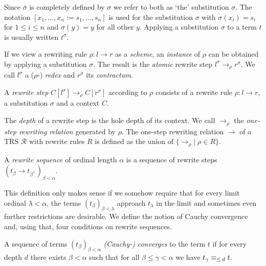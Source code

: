 Since $\bar{\sigma}$ is completely defined by $\sigma$ we refer to both as
`the' substitution $\sigma$. The notation $[x_1, \ldots, x_n := s_1, \ldots,
  s_n]$ is used for the substitution $\sigma$ with $\sigma(x_i) = s_i$ for $1
\leq i \leq n$ and $\sigma(y) = y$ for all other $y$. Applying a substitution
$\sigma$ to a term $t$ is usually written $t^\sigma$.

If we view a rewriting rule $\rho : l \rightarrow r$ as a \emph{scheme}, an
\emph{instance} of $\rho$ can be obtained by applying a substitution
$\sigma$. The result is the \emph{atomic} rewrite step $l^\sigma
\rightarrow_\rho r^\sigma$. We call $l^\sigma$ a ($\rho$-) \emph{redex} and
$r^\sigma$ its \emph{contractum}.

\begin{definition}%
A \emph{rewrite step} $C[l^\sigma] \rightarrow_\rho C[r^\sigma]$ according to
$\rho$ consists of a rewrite rule $\rho : l \rightarrow r$, a substitution
$\sigma$ and a context $C$.
\end{definition}

The \emph{depth} of a rewrite step is the hole depth of its context.
We call $\rightarrow_\rho$ the \emph{one-step rewriting relation} generated by
$\rho$. The one-step rewriting relation $\rightarrow$ of a TRS $\mathcal{R}$
with rewrite rules $R$ is defined as the union of $\{ \rightarrow_\rho | \;
\rho \in R \}$.

\begin{definition}%
A \emph{rewrite sequence} of ordinal length $\alpha$ is a sequence of rewrite
steps $(t_\beta \rightarrow t_{\beta^+})_{\beta < \alpha}$.
\end{definition}

This definition only makes sense if we somehow require that for every limit
ordinal $\lambda < \alpha$, the terms $(t_\beta)_{\beta < \lambda}$ approach
$t_\lambda$ in the limit and sometimes even further restrictions are
desirable. We define the notion of Cauchy convergence and, using that, four
conditions on rewrite sequences.

\begin{definition}\label{def:cauchy}%
  A sequence of terms $(t_\beta)_{\beta < \alpha}$ \emph{(Cauchy-) converges}
  to the term $t$ if for every depth $d$ there exists $\beta < \alpha$ such
  that for all $\beta \le \gamma < \alpha$ we have $t_\gamma \equiv_{\le \, d} t$.
\end{definition}

